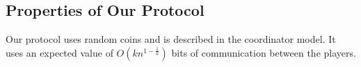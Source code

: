 \documentclass{article}
\newcommand{\TODO}[1]{ {\color{red} #1 }}
\newcommand{\rv}[1]{\mathbf{#1}}
\theoremstyle{plain}
\begin{document}
%
%
%





\subsection{Properties of Our Protocol}
Our protocol uses random coins and is described in the coordinator model. It uses an expected value of $O(kn^{1-\frac{1}{k}})$ bits of communication between the players.
\end{document}
